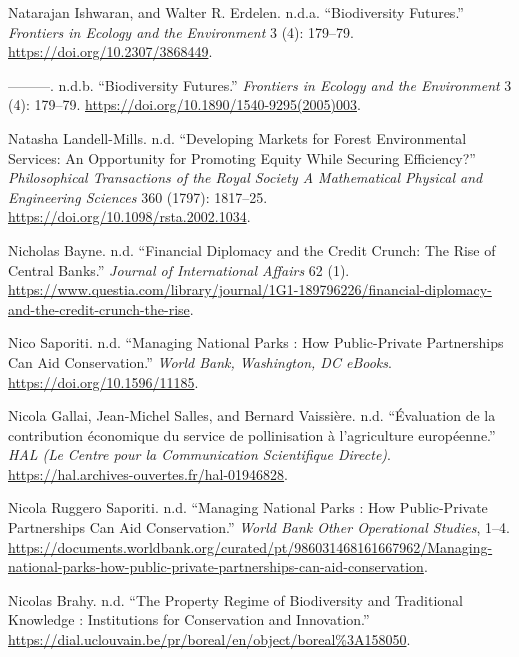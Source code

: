 \begin{CSLReferences}{1}{0}
Natarajan Ishwaran, and Walter R. Erdelen. n.d.a. {``Biodiversity
Futures.''} \emph{Frontiers in Ecology and the Environment} 3 (4):
179--79. \url{https://doi.org/10.2307/3868449}.

---------. n.d.b. {``Biodiversity Futures.''} \emph{Frontiers in Ecology
and the Environment} 3 (4): 179--79.
\url{https://doi.org/10.1890/1540-9295(2005)003}.

Natasha Landell-Mills. n.d. {``Developing Markets for Forest
Environmental Services: An Opportunity for Promoting Equity While
Securing Efficiency?''} \emph{Philosophical Transactions of the Royal
Society A Mathematical Physical and Engineering Sciences} 360 (1797):
1817--25. \url{https://doi.org/10.1098/rsta.2002.1034}.

Nicholas Bayne. n.d. {``Financial Diplomacy and the Credit Crunch: The
Rise of Central Banks.''} \emph{Journal of International Affairs} 62
(1).
\url{https://www.questia.com/library/journal/1G1-189796226/financial-diplomacy-and-the-credit-crunch-the-rise}.

Nico Saporiti. n.d. {``Managing National Parks : How Public-Private
Partnerships Can Aid Conservation.''} \emph{World Bank, Washington, DC
eBooks}. \url{https://doi.org/10.1596/11185}.

Nicola Gallai, Jean‐Michel Salles, and Bernard Vaissière. n.d.
{``Évaluation de la contribution économique du service de pollinisation
à l'agriculture européenne.''} \emph{HAL (Le Centre pour la
Communication Scientifique Directe)}.
\url{https://hal.archives-ouvertes.fr/hal-01946828}.

Nicola Ruggero Saporiti. n.d. {``Managing National Parks : How
Public-Private Partnerships Can Aid Conservation.''} \emph{World Bank
Other Operational Studies}, 1--4.
\url{https://documents.worldbank.org/curated/pt/986031468161667962/Managing-national-parks-how-public-private-partnerships-can-aid-conservation}.

Nicolas Brahy. n.d. {``The Property Regime of Biodiversity and
Traditional Knowledge : Institutions for Conservation and Innovation.''}
\url{https://dial.uclouvain.be/pr/boreal/en/object/boreal\%3A158050}.


\end{CSLReferences}
